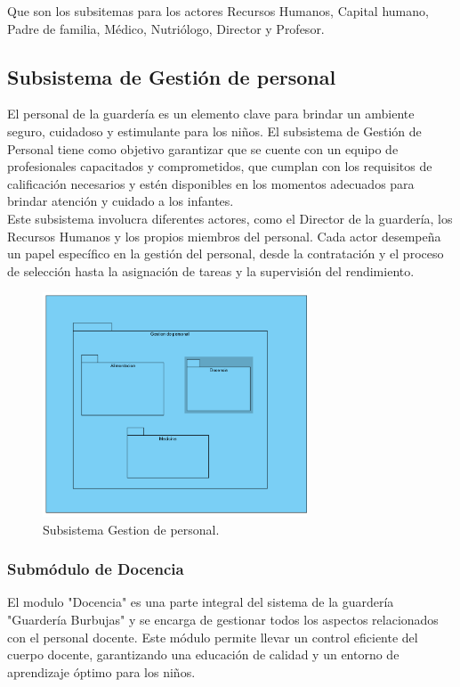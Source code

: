 Que son los subsitemas para los actores Recursos Humanos, Capital humano, Padre de familia, Médico, Nutriólogo, Director y Profesor.

\clearpage
\subsection{Subsistema de Gestión de personal}
El personal de la guardería es un elemento clave para brindar un ambiente seguro, cuidadoso y estimulante para los niños. El subsistema de Gestión de Personal tiene como objetivo garantizar que se cuente con un equipo de profesionales capacitados y comprometidos, que cumplan con los requisitos de calificación necesarios y estén disponibles en los momentos adecuados para brindar atención y cuidado a los infantes.
\\
Este subsistema involucra diferentes actores, como el Director de la guardería, los Recursos Humanos y los propios miembros del personal. Cada actor desempeña un papel específico en la gestión del personal, desde la contratación y el proceso de selección hasta la asignación de tareas y la supervisión del rendimiento.

\begin{figure}[htbp]
\centering
\includegraphics[width=0.7\textwidth]{images/arqui/subPersonal.png}
\caption{Subsistema Gestion de personal.}
\label{fig:subsistsalud}
\end{figure}

\subsubsection{Submódulo de Docencia}
El modulo "Docencia" es una parte integral del sistema de la guardería "Guardería Burbujas" y se encarga de gestionar todos los aspectos relacionados con el personal docente. Este módulo permite llevar un control eficiente del cuerpo docente, garantizando una educación de calidad y un entorno de aprendizaje óptimo para los niños.

